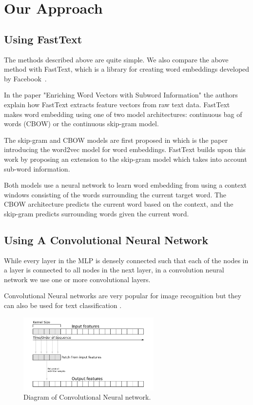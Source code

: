 \section{Our Approach}

\subsection{Using FastText}

The methods described above are quite simple. We also compare the above method with FastText, which is a library for creating word embeddings developed by Facebook~\cite{BagOfTricks}. 

In the paper "Enriching Word Vectors with Subword Information" \cite{EnrichingWordVectors} the authors explain how FastText extracts feature vectors from raw text data. FastText makes word embedding using one of two model architectures: continuous bag of words (CBOW) or the continuous skip-gram model.

The skip-gram and CBOW models are first proposed in \cite{EfficientWordRepresentations} which is the paper introducing the word2vec model for word embeddings. FastText builds upon this work by proposing an extension to the skip-gram model which takes into account sub-word information.

Both models use a neural network to learn word embedding from using a context windows consisting of the words surrounding the current target word. The CBOW architecture predicts the current word based on the context, and the skip-gram predicts surrounding words given the current word.\cite{EfficientWordRepresentations}

\subsection{Using A Convolutional Neural Network}

While every layer in the MLP is densely connected such that each of the nodes in a layer is connected to all nodes in the next layer, in a convolution neural network we use one or more convolutional layers.

Convolutional Neural networks are very popular for image recognition but they can also be used for text classification \cite{textcnn_google}.

\begin{figure}[h!]
  \centering
  \includegraphics[width = 200pt]{figs/cnn_diagram}
  \caption{Diagram of Convolutional Neural network.}
  \label{cnn}
\end{figure}

